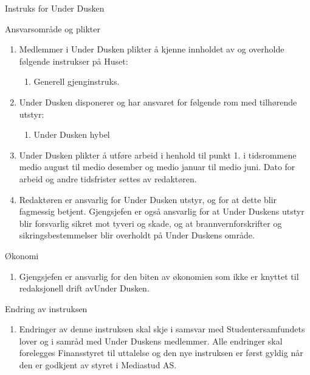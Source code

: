 \begin{instruks*}{Instruks for Under Dusken}
    \begin{instruksledd}{Ansvarsområde og plikter}
        \begin{enumerate}   
            \item  Medlemmer i Under Dusken plikter å kjenne innholdet av og overholde følgende
                instrukser på Huset:
                \begin{enumerate}
                    \item Generell gjenginstruks.
                \end{enumerate}
            \item Under Dusken disponerer og har ansvaret for følgende rom med tilhørende utstyr:
                \begin{enumerate}
                    \item Under Dusken hybel
                \end{enumerate}
            \item Under Dusken plikter å utføre arbeid i henhold til punkt 1. i tidsrommene
                medio august til medio desember og medio januar til medio juni. Dato for arbeid og andre tidsfrister
                settes av redaktøren.
            \item Redaktøren er ansvarlig for Under Dusken utstyr, og for at dette blir fagmessig
                betjent. Gjengsjefen er også ansvarlig for at Under Duskens utstyr blir forsvarlig sikret mot tyveri
                og skade, og at brannvernforskrifter og sikringsbestemmelser blir overholdt på Under Duskens område.
        \end{enumerate}
    \end{instruksledd}

    \begin{instruksledd}{Økonomi}
        \begin{enumerate}
            \item Gjengsjefen er ansvarlig for den biten av økonomien som ikke er knyttet til
                redaksjonell drift avUnder Dusken.
        \end{enumerate}
    \end{instruksledd}

    \begin{instruksledd}{Endring av instruksen}
        \begin{enumerate}
            \item Endringer av denne instruksen skal skje i samsvar med Studentersamfundets
                lover og i samråd med Under Duskens medlemmer. Alle endringer skal forelegges Finansstyret til
                uttalelse og den nye instruksen er først gyldig når den er godkjent av styret i Mediastud AS.
        \end{enumerate}
    \end{instruksledd}


\end{instruks*}
